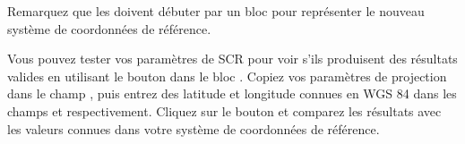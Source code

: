 Remarquez que les  doivent débuter par un 
bloc  pour représenter le nouveau système de coordonnées de
référence.

Vous pouvez tester vos paramètres de SCR pour voir s'ils produisent des 
résultats valides en utilisant le bouton  dans le bloc 
. Copiez vos paramètres de projection dans le champ
, puis entrez des latitude et longitude connues en WGS 84
dans les champs  et  respectivement. Cliquez sur
le bouton  et comparez les résultats avec les valeurs connues
dans votre système de coordonnées de référence.
